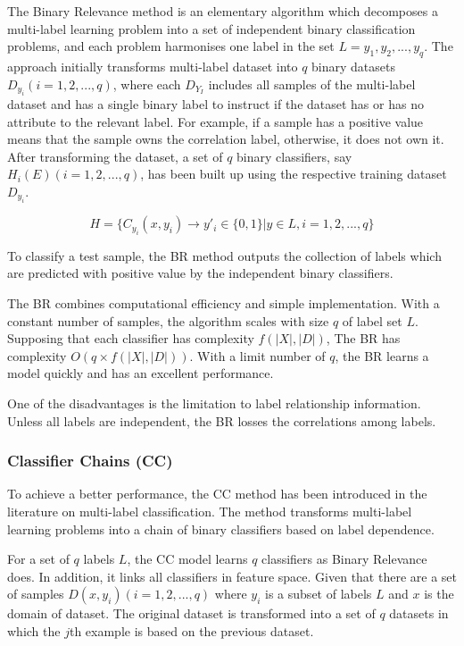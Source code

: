 The Binary Relevance method is an elementary algorithm which decomposes a multi-label learning problem into a set of independent binary classification problems, and each problem harmonises one label in the set $L = {y_{1}, y_{2},...,y_{q}}$. The approach initially transforms multi-label dataset into $q$ binary datasets $D_{y_{i}} (i = 1,2,...,q)$, where each $D_{Y_{I}}$ includes all samples of the multi-label dataset and has a single binary label to instruct if the dataset has or has no attribute to the relevant label. For example, if a sample has a positive value means that the sample owns the correlation label, otherwise, it does not own it. After transforming the dataset, a set of $q$ binary classifiers, say $H_{i}(E) (i = 1,2,...,q)$, has been built up using the respective training dataset $D_{y_{i}}$. 

\begin{equation}\label{eq:BinaryRelevance}
H = \{C_{y_{i}}(x, y_{i}) \to y'_{i} \in \{0,1\}| y \in L, i = 1,2,...,q\}
\end{equation}

To classify a test sample, the BR method outputs the collection of labels which are predicted with positive value by the independent binary classifiers.

The BR combines computational efficiency and simple implementation. With a constant number of samples, the algorithm scales with size $q$ of label set $L$. Supposing that each classifier has complexity $f(|X|,|D|)$, The BR has complexity $O(q \times f(|X|,|D|))$. With a limit number of $q$, the BR learns a model quickly and has an excellent performance.

One of the disadvantages is the limitation to label relationship information. Unless all labels are independent, the BR losses the correlations among labels.

\subsubsection{Classifier Chains (CC)}

To achieve a better performance, the CC method has been introduced in the literature on multi-label classification\citep{read2011classifier}. The method transforms multi-label learning problems into a chain of binary classifiers based on label dependence.

For a set of $q$ labels $L$, the CC model learns $q$ classifiers as Binary Relevance does. In addition, it links all classifiers in feature space. Given that there are a set of samples $D(x,y_{i}) (i = 1,2,...,q)$ where $y_{i}$ is a subset of labels $L$ and $x$ is the domain of dataset. The original dataset is transformed into a set of $q$ datasets in which the $j$th example is based on the previous dataset.

